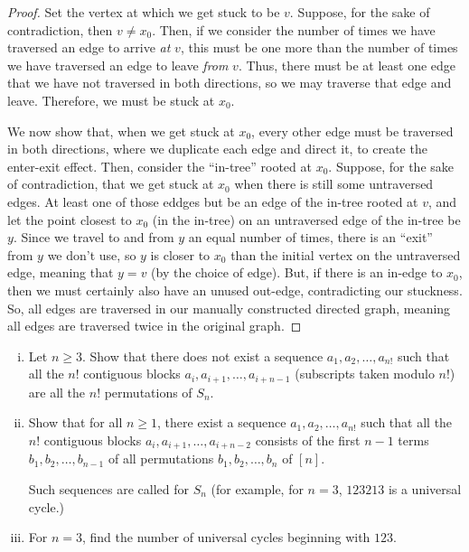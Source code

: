 \documentclass[11pt]{article}
\begin{document}
\begin{proof}
    Set the vertex at which we get stuck to be $v$. Suppose, for the sake of contradiction, then $v\neq x_0$. Then, if we consider the number of times we have traversed an edge to arrive \textit{at} $v$, this must be one more than the number of times we have traversed an edge to leave \textit{from} $v$. Thus, there must be at least one edge that we have not traversed in both directions, so we may traverse that edge and leave. Therefore, we must be stuck at $x_0$.

    We now show that, when we get stuck at $x_0$, every other edge must be traversed in both directions, where we duplicate each edge and direct it, to create the enter-exit effect. Then, consider the ``in-tree'' rooted at $x_0$. Suppose, for the sake of contradiction, that we get stuck at $x_0$ when there is still some untraversed edges. At least one of those eddges but be an edge of the in-tree rooted at $v$, and let the point closest to $x_0$ (in the in-tree) on an untraversed edge of the in-tree be $y$. Since we travel to and from $y$ an equal number of times, there is an ``exit'' from $y$ we don't use, so $y$ is closer to $x_0$ than the initial vertex on the untraversed edge, meaning that $y=v$ (by the choice of edge). But, if there is an in-edge to $x_0$, then we must certainly also have an unused out-edge, contradicting our stuckness. So, all edges are traversed in our manually constructed directed graph, meaning all edges are traversed twice in the original graph.
\end{proof}
\begin{quest}[\textcolor{red}{Universal cycles for $S_n$}]
    \begin{enumerate}[(i)]
        \item Let $n\geq 3$. Show that there does not exist a sequence $a_1,a_2,\dots,a_{n!}$ such that all the $n!$ contiguous blocks $a_{i},a_{i+1},\dots,a_{i+n-1}$ (subscripts taken modulo $n!$) are all the $n!$ permutations of $S_n$.
        \item Show that for all $n\geq 1$, there exist a sequence $a_1,a_2,\dots,a_{n!}$ such that all the $n!$ contiguous blocks $a_{i},a_{i+1},\dots,a_{i+n-2}$ consists of the first $n-1$ terms $b_1,b_2,\dots,b_{n-1}$ of all permutations $b_1,b_2,\dots,b_n$ of $[n]$. 
        
        Such sequences are called  for $S_n$ (for example, for $n=3$, $123213$ is a universal cycle.)
        \item For $n=3$, find the number of universal cycles beginning with $123$.
    \end{enumerate}
\end{quest}
\end{document}
